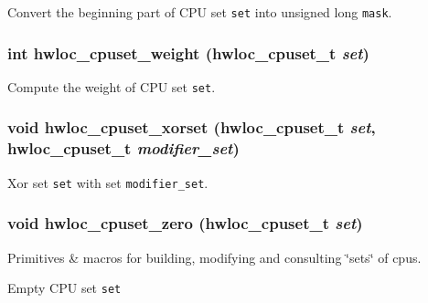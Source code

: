 Convert the beginning part of CPU set {\tt set} into unsigned long {\tt mask}. 

\hypertarget{group__hwlocality__cpuset_g84bda8f4363d5ed3e55ac0634c3bc5cc}{
\subsubsection[{hwloc\_\-cpuset\_\-weight}]{\setlength{\rightskip}{0pt plus 5cm}int hwloc\_\-cpuset\_\-weight ({\bf hwloc\_\-cpuset\_\-t} {\em set})}}
\label{group__hwlocality__cpuset_g84bda8f4363d5ed3e55ac0634c3bc5cc}


Compute the weight of CPU set {\tt set}. 

\hypertarget{group__hwlocality__cpuset_ga79683934fe19784f17da38d16d14ec2}{
\subsubsection[{hwloc\_\-cpuset\_\-xorset}]{\setlength{\rightskip}{0pt plus 5cm}void hwloc\_\-cpuset\_\-xorset ({\bf hwloc\_\-cpuset\_\-t} {\em set}, \/  {\bf hwloc\_\-cpuset\_\-t} {\em modifier\_\-set})}}
\label{group__hwlocality__cpuset_ga79683934fe19784f17da38d16d14ec2}


Xor set {\tt set} with set {\tt modifier\_\-set}. 

\hypertarget{group__hwlocality__cpuset_g4d63507128a35e6eda3fa6104970ac99}{
\subsubsection[{hwloc\_\-cpuset\_\-zero}]{\setlength{\rightskip}{0pt plus 5cm}void hwloc\_\-cpuset\_\-zero ({\bf hwloc\_\-cpuset\_\-t} {\em set})}}
\label{group__hwlocality__cpuset_g4d63507128a35e6eda3fa6104970ac99}


Primitives \& macros for building, modifying and consulting \char`\"{}sets\char`\"{} of cpus. 

Empty CPU set {\tt set} 

